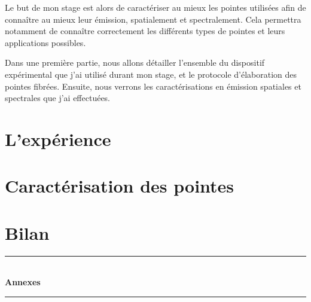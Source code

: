 \documentclass[a4paper,12pt]{report}
\begin{document}
Le but de mon stage est alors de caractériser au mieux les pointes utilisées afin de connaître au mieux leur émission, spatialement et spectralement. Cela permettra notamment de connaître correctement les différents types de pointes et leurs applications possibles.

Dans une première partie, nous allons détailler l'ensemble du dispositif expérimental que j'ai utilisé durant mon stage, et le protocole d'élaboration des pointes fibrées. Ensuite, nous verrons les caractérisations en émission spatiales et spectrales que j'ai effectuées.

\chapter{L'expérience}


\chapter{Caractérisation des pointes}


\chapter*{Bilan}
%





\newpage
\appendix
{}
{}

\vspace*{8cm}
\begin{center}
\rule{\linewidth}{0.5mm}\\[0.7cm]
{\huge{\bfseries Annexes}}\\[0.4cm]
\rule{\linewidth}{0.5mm}\\[0.5cm]


\end{center}
%

\newpage
%
\end{document}
